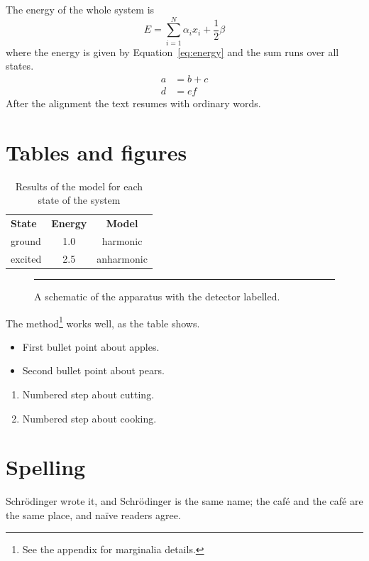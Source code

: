 \documentclass{article}
\begin{document}
The energy of the whole system is
\begin{equation}
  E = \sum_{i=1}^{N} \alpha_i x_i + \frac{1}{2} \beta
  \label{eq:energy}
\end{equation}
where the energy is given by Equation~\ref{eq:energy} and the sum runs over all states.
\begin{align}
  a &= b + c \\
  d &= e f
\end{align}
After the alignment the text resumes with ordinary words.

\section{Tables and figures}

\begin{table}[H]
  \centering
  \caption{Results of the model for each state of the system}
  \begin{tabular}{lcc}
    \textbf{State} & \textbf{Energy} & \textbf{Model} \\
    ground & 1.0 & harmonic \\
    excited & 2.5 & anharmonic \\
  \end{tabular}
\end{table}

\begin{figure}[H]
  \centering
  \rule{3cm}{1cm}
  \caption{A schematic of the apparatus with the detector labelled.}
\end{figure}

The method\footnote{See the appendix for marginalia details.} works well, as the table shows.

\begin{itemize}
  \item First bullet point about apples.
  \item Second bullet point about pears.
\end{itemize}
\begin{enumerate}
  \item Numbered step about cutting.
  \item Numbered step about cooking.
\end{enumerate}

\section{Spelling}

Schr\"odinger wrote it, and Schrödinger is the same name; the café and the caf\'e are the same place, and na\"ive readers agree.
\end{document}
